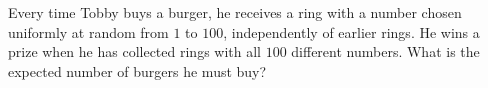 Every time Tobby buys a burger, he receives a ring with a number chosen uniformly at random from $1$ to $100$, independently of earlier rings. He wins a prize when he has collected rings with all $100$ different numbers. What is the expected number of burgers he must buy?
